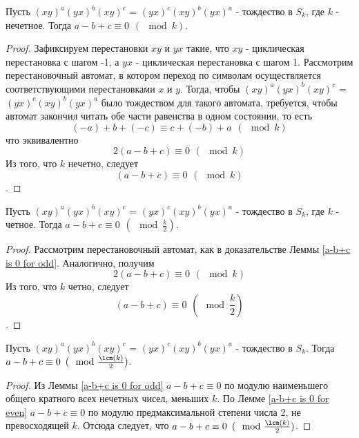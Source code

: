 	\begin{lemma} \label{a-b+c is 0 for odd}
		Пусть $(xy)^a(yx)^b(xy)^c$ = $(yx)^c(xy)^b(yx)^a$ - тождество в $S_k$, где $k$ - нечетное. Тогда $a - b + c \equiv 0 \hspace{5pt} (\mod k)$.
	\end{lemma}
	\begin{proof}
		Зафиксируем перестановки $xy$ и $yx$ %
		такие, что $xy$ - циклическая перестановка с шагом -1, а $yx$ - циклическая перестановка с шагом 1.
		Рассмотрим перестановочный автомат, в котором переход по символам осуществляется соответствующими перестановками $x$ и $y$. Тогда, чтобы $(xy)^a(yx)^b(xy)^c$ = $(yx)^c(xy)^b(yx)^a$ было тождеством для такого автомата, требуется, чтобы автомат закончил читать обе части равенства в одном состоянии, то есть	
		\begin{equation}
		(-a) + b + (-c) \equiv c + (-b) + a \hspace{5pt} (\mod k)
		\end{equation}
		что эквивалентно 
		\begin{equation}
		2(a - b + c) \equiv 0 \hspace{5pt} (\mod k)
		\end{equation}
		Из того, что $k$ нечетно, следует 
		$$
		(a - b + c) \equiv 0 \hspace{5pt} (\mod k)
		$$.
	\end{proof}

	\begin{lemma} \label{a-b+c is 0 for even}
		Пусть $(xy)^a(yx)^b(xy)^c$ = $(yx)^c(xy)^b(yx)^a$ - тождество в $S_k$, где $k$ - четное. Тогда $a - b + c \equiv 0 \hspace{5pt} (\mod \frac{k}{2})$.
	\end{lemma}
	\begin{proof}
		Рассмотрим перестановочный автомат, как в доказательстве Леммы \ref{a-b+c is 0 for odd}. Аналогично, получим	
		\begin{equation}
		2(a - b + c) \equiv 0 \hspace{5pt} (\mod k)
		\end{equation}
		Из того, что $k$ четно, следует 
		$$
		(a - b + c) \equiv 0 \hspace{5pt} (\mod \frac{k}{2})
		$$.
	\end{proof}

	\begin{corollary} \label{a-b+c is 0 mod lcm/2}
		Пусть $(xy)^a(yx)^b(xy)^c$ = $(yx)^c(xy)^b(yx)^a$ - тождество в $S_k$. Тогда $a - b + c \equiv 0 \hspace{5pt} (\mod \frac{\lcm(k)}{2})$.
	\end{corollary}
	\begin{proof}
		Из Леммы \ref{a-b+c is 0 for odd} $a - b + c \equiv 0$ по модулю наименьшего общего кратного всех нечетных чисел, меньших $k$.
		По Лемме \ref{a-b+c is 0 for even} $a - b + c \equiv 0$ по модулю предмаксимальной степени числа 2, не превосходящей $k$.
		Отсюда следует, что $a - b + c \equiv 0 \hspace{5pt} (\mod \frac{\lcm(k)}{2})$.
	\end{proof}


